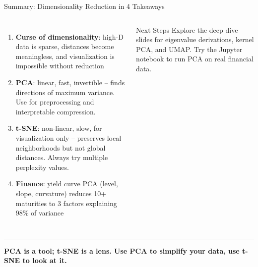 \documentclass[8pt,aspectratio=169]{beamer}
\newcommand{\bottomnote}[1]{%
\vfill
\vspace{-2mm}
\textcolor{mllavender2}{\rule{\textwidth}{0.4pt}}
\vspace{1mm}
\footnotesize
\textbf{#1}
}
\newcommand{\highlight}[1]{\textcolor{mlorange}{\textbf{#1}}}
\begin{document}
\begin{frame}[t]{Summary: Dimensionality Reduction in 4 Takeaways}
\begin{columns}[T]
\small
\begin{enumerate}
\setlength{\itemsep}{6pt}
\item \highlight{Curse of dimensionality}: high-D data is sparse, distances become meaningless, and visualization is impossible without reduction
\item \highlight{PCA}: linear, fast, invertible -- finds directions of maximum variance. Use for preprocessing and interpretable compression.
\item \highlight{t-SNE}: non-linear, slow, for visualization only -- preserves local neighborhoods but not global distances. Always try multiple perplexity values.
\item \highlight{Finance}: yield curve PCA (level, slope, curvature) reduces 10+ maturities to 3 factors explaining 98\% of variance
\end{enumerate}

\vspace{4mm}
\begin{block}{Next Steps}
\scriptsize Explore the deep dive slides for eigenvalue derivations, kernel PCA, and UMAP. Try the Jupyter notebook to run PCA on real financial data.
\end{block}
\end{columns}

\bottomnote{PCA is a tool; t-SNE is a lens. Use PCA to simplify your data, use t-SNE to look at it.}
\end{frame}
\end{document}
